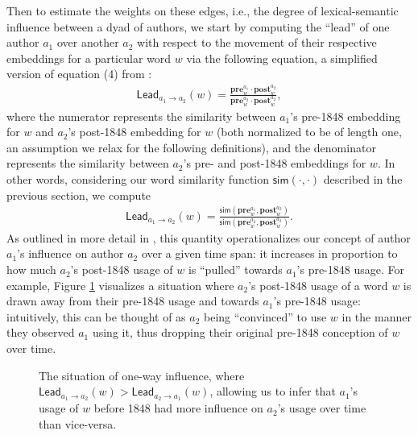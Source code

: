 \documentclass[11pt]{article}
\begin{document}


Then to estimate the weights on these edges, i.e., the degree of lexical-semantic influence between a dyad of authors, we start by computing the ``lead'' of one author $a_1$ over another $a_2$ with respect to the movement of their respective embeddings for a particular word $w$ via the following equation, a simplified version of equation (4) from \cite{soni_abolitionist_2021}:
\begin{align*}
	\mathsf{Lead}_{a_1 \rightarrow a_2}(w) = \frac{\mathbf{pre}_w^{a_1} \cdot \mathbf{post}_w^{a_2}}{\mathbf{pre}_w^{a_2} \cdot \mathbf{post}_w^{a_2}},
\end{align*}
where the numerator represents the similarity between $a_1$'s pre-1848 embedding for $w$ and $a_2$'s post-1848 embedding for $w$ (both normalized to be of length one, an assumption we relax for the following definitions), and the denominator represents the similarity between $a_2$'s pre- and post-1848 embeddings for $w$. In other words, considering our word similarity function $\mathsf{sim}(\cdot, \cdot)$ described in the previous section, we compute
\begin{align*}
	\mathsf{Lead}_{a_1 \rightarrow a_2}(w) = \frac{\mathsf{sim}(\mathbf{pre}_w^{a_1}, \mathbf{post}_w^{a_2})}{\mathsf{sim}(\mathbf{pre}_w^{a_2}, \mathbf{post}_w^{a_2})}.
\end{align*}
As outlined in more detail in \cite{soni_abolitionist_2021}, this quantity operationalizes our concept of author $a_1$'s influence on author $a_2$ over a given time span: it increases in proportion to how much $a_2$'s post-1848 usage of $w$ is ``pulled'' towards $a_1$'s pre-1848 usage. For example, Figure \ref{fig:onewayinfluence} visualizes a situation where $a_2$'s post-1848 usage of a word $w$ is drawn away from their pre-1848 usage and towards $a_1$'s pre-1848 usage: intuitively, this can be thought of as $a_2$ being ``convinced'' to use $w$ in the manner they observed $a_1$ using it, thus dropping their original pre-1848 conception of $w$ over time.

\begin{figure}[ht!]
	\centering
	
	\caption{The situation of one-way influence, where $\mathsf{Lead}_{a_1 \rightarrow a_2}(w) > \mathsf{Lead}_{a_2 \rightarrow a_1}(w)$, allowing us to infer that $a_1$'s usage of $w$ before 1848 had more influence on $a_2$'s usage over time than vice-versa.}
	\label{fig:onewayinfluence}
\end{figure}
\end{document}
